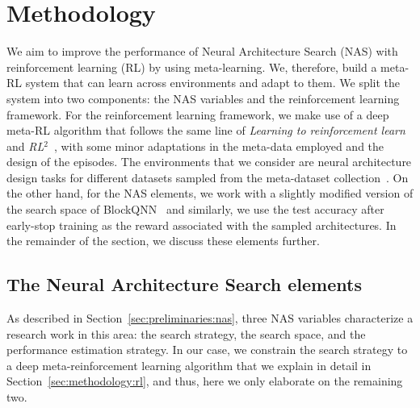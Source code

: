 \section{Methodology}\label{sec:methodology}

We aim to improve the performance of Neural Architecture Search (NAS) with reinforcement learning (RL) by using meta-learning. We, therefore, build a meta-RL system that can learn across environments and adapt to them. We split the system into two components: the NAS variables and the reinforcement learning framework. For the reinforcement learning framework, we make use of a deep meta-RL algorithm that follows the same line of \textit{Learning to reinforcement learn}~\citep{LtRL} and \textit{RL$^2$}~\citep{RL2}, with some minor adaptations in the meta-data employed and the design of the episodes. The environments that we consider are neural architecture design tasks for different datasets sampled from the meta-dataset collection~\citep{MetaDataset}. On the other hand, for the NAS elements, we work with a slightly modified version of the search space of BlockQNN~\citep{BlockQNN} and similarly, we use the test accuracy after early-stop training as the reward associated with the sampled architectures. In the remainder of the section, we discuss these elements further.%



\subsection{The Neural Architecture Search elements}\label{sec:methodology:nas}

As described in Section~\ref{sec:preliminaries:nas}, three NAS variables characterize a research work in this area: the search strategy, the search space, and the performance estimation strategy. In our case, we constrain the search strategy to a deep meta-reinforcement learning algorithm that we explain in detail in Section~\ref{sec:methodology:rl}, and thus, here we only elaborate on the remaining two. 

